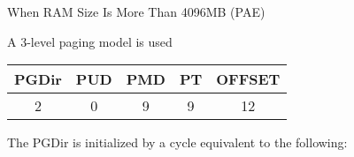 \begin{frame}{When RAM Size Is More Than 4096MB (PAE)}
  \begin{block}{A 3-level paging model is used}
    \begin{center}
    \end{center}
  \end{block}
  \begin{center}
    \begin{tabular}{|c|c|c|c|c|}
      \hline
      PGDir&PUD&PMD&PT&OFFSET\\\hline
      2&0&9&9&12\\\hline
    \end{tabular}
  \end{center}
\end{frame}

\begin{frame}
  \begin{block}{The PGDir is initialized by a cycle equivalent to the following:}
    \begin{center}
    \end{center}
  \end{block}
\end{frame}

